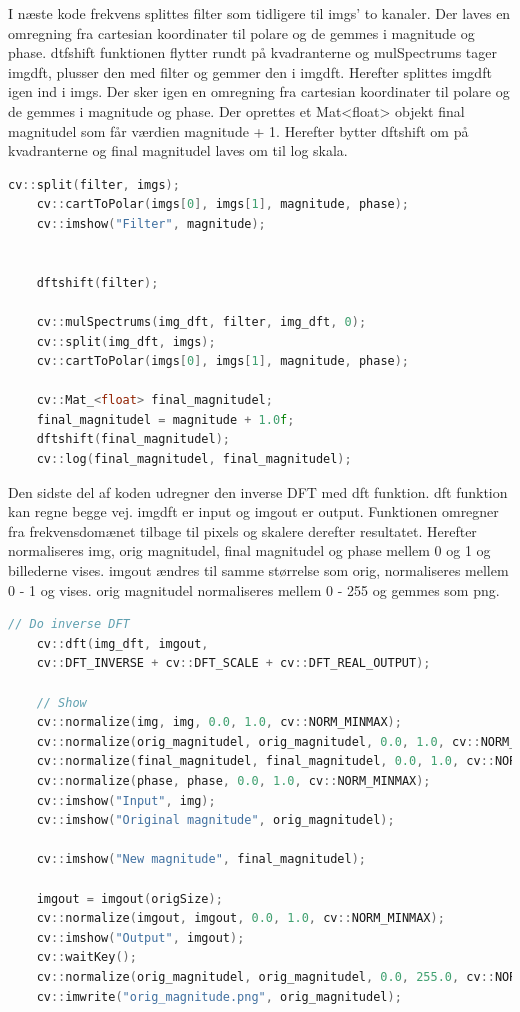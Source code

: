 \documentclass{article}
\begin{document}
I næste kode frekvens splittes filter som tidligere til imgs' to kanaler. Der laves en omregning fra cartesian koordinater til polare og de gemmes i magnitude og phase. dtfshift funktionen flytter rundt på kvadranterne og mulSpectrums tager imgdft, plusser den med filter og gemmer den i imgdft.\newline 
Herefter splittes imgdft igen ind i imgs. Der sker igen en omregning fra cartesian koordinater til polare og de gemmes i magnitude og phase. \newline 
Der oprettes et Mat<float> objekt final magnitudel som får værdien magnitude + 1. Herefter bytter dftshift om på kvadranterne og final magnitudel laves om til log skala. \newline 
\begin{lstlisting}[language=c++]
    cv::split(filter, imgs);
    cv::cartToPolar(imgs[0], imgs[1], magnitude, phase);
    cv::imshow("Filter", magnitude);


    dftshift(filter);

    cv::mulSpectrums(img_dft, filter, img_dft, 0);
    cv::split(img_dft, imgs);
    cv::cartToPolar(imgs[0], imgs[1], magnitude, phase);

    cv::Mat_<float> final_magnitudel;
    final_magnitudel = magnitude + 1.0f;
    dftshift(final_magnitudel);
    cv::log(final_magnitudel, final_magnitudel);
\end{lstlisting}
Den sidste del af koden udregner den inverse DFT med dft funktion. dft funktion kan regne begge vej. imgdft er input og imgout er output. Funktionen omregner fra frekvensdomænet tilbage til pixels og skalere derefter resultatet. \newline 
Herefter normaliseres img, orig magnitudel, final magnitudel og phase mellem 0 og 1 og billederne vises. \newline 
imgout ændres til samme størrelse som orig, normaliseres mellem 0 - 1 og vises. orig magnitudel normaliseres mellem 0 - 255 og gemmes som png.\newline 
\begin{lstlisting}[language=c++]
    // Do inverse DFT
    cv::dft(img_dft, imgout,
    cv::DFT_INVERSE + cv::DFT_SCALE + cv::DFT_REAL_OUTPUT);

    // Show
    cv::normalize(img, img, 0.0, 1.0, cv::NORM_MINMAX);
    cv::normalize(orig_magnitudel, orig_magnitudel, 0.0, 1.0, cv::NORM_MINMAX);
    cv::normalize(final_magnitudel, final_magnitudel, 0.0, 1.0, cv::NORM_MINMAX);
    cv::normalize(phase, phase, 0.0, 1.0, cv::NORM_MINMAX);
    cv::imshow("Input", img);
    cv::imshow("Original magnitude", orig_magnitudel);

    cv::imshow("New magnitude", final_magnitudel);

    imgout = imgout(origSize);
    cv::normalize(imgout, imgout, 0.0, 1.0, cv::NORM_MINMAX);
    cv::imshow("Output", imgout);
    cv::waitKey();
    cv::normalize(orig_magnitudel, orig_magnitudel, 0.0, 255.0, cv::NORM_MINMAX);
    cv::imwrite("orig_magnitude.png", orig_magnitudel);
\end{lstlisting}
\end{document}

